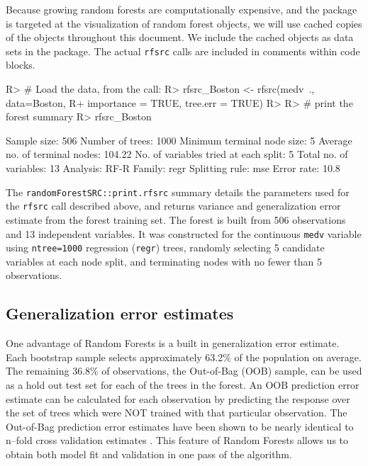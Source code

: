 \documentclass[article]{jss}
\begin{document}
Because growing random forests are computationally expensive, and the
 package is targeted at the visualization of random
forest objects, we will use cached copies of the 
objects throughout this document. We include the cached objects as data
sets in the  package. The actual \texttt{rfsrc}
calls are included in comments within code blocks.

\begin{CodeChunk}

\begin{CodeInput}
R> # Load the data, from the call:
R> rfsrc_Boston <- rfsrc(medv~., data=Boston, 
R+                       importance = TRUE, tree.err = TRUE)
R> 
R> # print the forest summary
R> rfsrc_Boston
\end{CodeInput}

\begin{CodeOutput}
                         Sample size: 506
                     Number of trees: 1000
          Minimum terminal node size: 5
       Average no. of terminal nodes: 104.22
No. of variables tried at each split: 5
              Total no. of variables: 13
                            Analysis: RF-R
                              Family: regr
                      Splitting rule: mse
                          Error rate: 10.8
\end{CodeOutput}
\end{CodeChunk}

The \texttt{randomForestSRC::print.rfsrc} summary details the parameters
used for the \texttt{rfsrc} call described above, and returns variance
and generalization error estimate from the forest training set. The
forest is built from 506 observations and 13 independent variables. It
was constructed for the continuous \texttt{medv} variable using
\texttt{ntree=1000} regression (\texttt{regr}) trees, randomly selecting
5 candidate variables at each node split, and terminating nodes with no
fewer than 5 observations.

\subsection{Generalization error
estimates}\label{generalization-error-estimates}

One advantage of Random Forests is a built in generalization error
estimate. Each bootstrap sample selects approximately 63.2\% of the
population on average. The remaining 36.8\% of observations, the
Out-of-Bag (OOB) \citep{BreimanOOB:1996e} sample, can be used as a hold
out test set for each of the trees in the forest. An OOB prediction
error estimate can be calculated for each observation by predicting the
response over the set of trees which were NOT trained with that
particular observation. The Out-of-Bag prediction error estimates have
been shown to be nearly identical to n--fold cross validation estimates
\citep{StatisticalLearning:2009}. This feature of Random Forests allows
us to obtain both model fit and validation in one pass of the algorithm.
\end{document}
